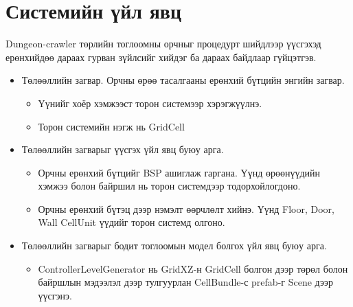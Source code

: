 \section{Системийн үйл явц}
Dungeon-crawler төрлийн тоглоомны орчныг процедурт шийдлээр үүсгэхэд ерөнхийдөө дараах гурван зүйлсийг хийдэг ба дараах байдлаар гүйцэтгэв.
\begin{itemize}
	\item Төлөөллийн загвар. Орчны өрөө тасалгааны ерөнхий бүтцийн энгийн загвар.
	      \begin{itemize}
		      \item Үүнийг хоёр хэмжээст торон системээр хэрэгжүүлнэ.
		      \item Торон системийн нэгж нь GridCell
	      \end{itemize}
	\item Төлөөллийн загварыг үүсгэх үйл явц буюу арга.
	      \begin{itemize}
		      \item Орчны ерөнхий бүтцийг BSP ашиглаж гаргана. Үүнд өрөөнүүдийн хэмжээ болон байршил нь торон системдээр тодорхойлогдоно.
		      \item Орчны ерөнхий бүтэц дээр нэмэлт өөрчлөлт хийнэ. Үүнд Floor, Door, Wall CellUnit үүдийг торон системд олгоно.
	      \end{itemize}
	\item Төлөөллийн загварыг бодит тоглоомын модел болгох үйл явц буюу арга.
	      \begin{itemize}
		      \item ControllerLevelGenerator нь GridXZ-н GridCell болгон дээр төрөл болон байршлын мэдээлэл дээр тулгуурлан CellBundle-с prefab-г Scene дээр үүсгэнэ.
	      \end{itemize}
\end{itemize}

